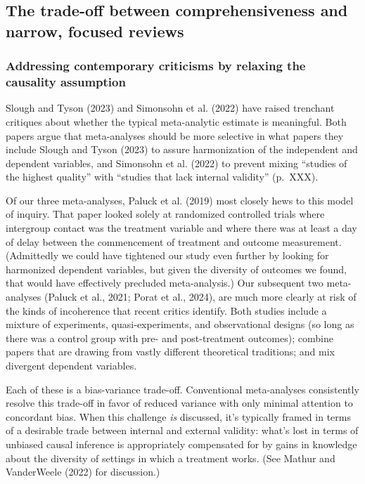 \documentclass[
  ,jou]{apa6}
\begin{document}
\subsection{The trade-off between comprehensiveness and narrow, focused reviews}\label{the-trade-off-between-comprehensiveness-and-narrow-focused-reviews}

\subsubsection{Addressing contemporary criticisms by relaxing the causality assumption}\label{addressing-contemporary-criticisms-by-relaxing-the-causality-assumption}

Slough and Tyson (2023) and Simonsohn et al. (2022) have raised trenchant critiques about whether the typical meta-analytic estimate is meaningful. Both papers argue that meta-analyses should be more selective in what papers they include \textemdash Slough and Tyson (2023) to assure harmonization of the independent and dependent variables, and Simonsohn et al. (2022) to prevent mixing ``studies of the highest quality'' with ``studies that lack internal validity'' (p.~XXX).

Of our three meta-analyses, Paluck et al. (2019) most closely hews to this model of inquiry. That paper looked solely at randomized controlled trials where intergroup contact was the treatment variable and where there was at least a day of delay between the commencement of treatment and outcome measurement. (Admittedly we could have tightened our study even further by looking for harmonized dependent variables, but given the diversity of outcomes we found, that would have effectively precluded meta-analysis.) Our subsequent two meta-analyses (Paluck et al., 2021; Porat et al., 2024), are much more clearly at risk of the kinds of incoherence that recent critics identify. Both studies include a mixture of experiments, quasi-experiments, and observational designs (so long as there was a control group with pre- and post-treatment outcomes); combine papers that are drawing from vastly different theoretical traditions; and mix divergent dependent variables.

Each of these is a bias-variance trade-off. Conventional meta-analyses consistently resolve this trade-off in favor of reduced variance with only minimal attention to concordant bias. When this challenge \emph{is} discussed, it's typically framed in terms of a desirable trade between internal and external validity: what's lost in terms of unbiased causal inference is appropriately compensated for by gains in knowledge about the diversity of settings in which a treatment works. (See Mathur and VanderWeele (2022) for discussion.)
\end{document}
